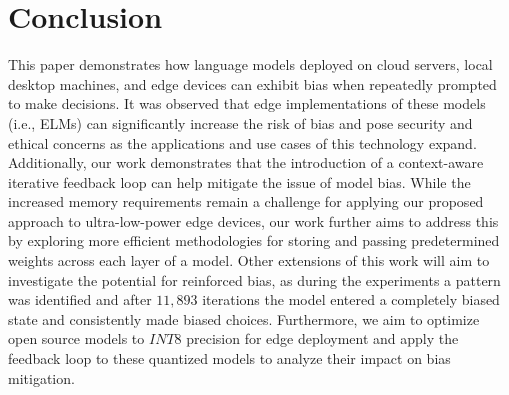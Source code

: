 
\section{Conclusion}
\label{sec:conclusion}

This paper demonstrates how language models deployed on cloud servers, local desktop machines, and edge devices can exhibit bias when repeatedly prompted to make decisions. 
It was observed that edge implementations of these models (i.e., ELMs) can significantly increase the risk of bias and pose security and ethical concerns as the applications and use cases of this technology expand. 
Additionally, our work demonstrates that the introduction of a context-aware iterative feedback loop can help mitigate the issue of model bias. 
While the increased memory requirements remain a challenge for applying our proposed approach to ultra-low-power edge devices, our work further aims to address this by exploring more efficient methodologies for storing and passing predetermined weights across each layer of a model. 
Other extensions of this work will aim to investigate the potential for reinforced bias, as during the experiments a pattern was identified and after $11,893$ iterations the model entered a completely biased state and consistently made biased choices. Furthermore, we aim to optimize open source models to $INT8$ precision for edge deployment and apply the feedback loop to these quantized models to analyze their impact on bias mitigation.

